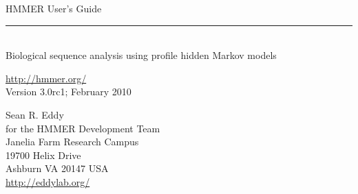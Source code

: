 \begin{titlepage}
{\Large

\vspace*{\fill}

\noindent
{\Huge {HMMER User's Guide}} \vspace{-8.0pt} \\ 
\rule[2pt]{\textwidth}{1pt} \\
\hspace*{\fill} {\large {Biological sequence analysis using
profile hidden Markov models} \\ }

\vspace*{\fill}

\begin{center}
\url{http://hmmer.org/}\\
Version 3.0rc1; February 2010 \\ 

\vspace*{\fill}

Sean R. Eddy\\
for the HMMER Development Team\\
Janelia Farm Research Campus\\
19700 Helix Drive\\
Ashburn VA 20147 USA\\
\url{http://eddylab.org/} \\
\end{center}

\vspace*{\fill}

}
\end{titlepage}

